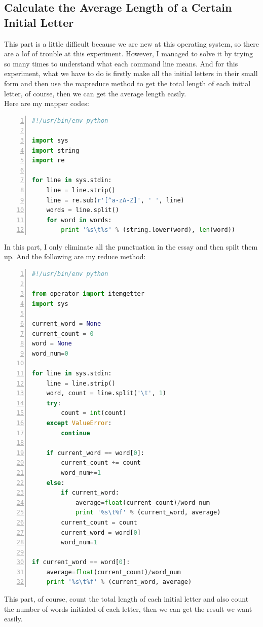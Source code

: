 \documentclass{article}
\begin{document}
\subsection{Calculate the Average Length of a Certain Initial Letter}
This part is a little difficult because we are new at this operating system, so there are a lof of trouble at this experiment. However, I managed to solve it by trying so many times to understand what each command line means. And for this experiment, what we have to do is firstly make all the initial letters in their small form and then use the mapreduce method to get the total length of each initial letter, of course, then we can get the average length easily.\\
Here are my mapper codes:
\begin{lstlisting}[language=python,numbers=left,frame=leftline]
#!/usr/bin/env python

import sys
import string
import re

for line in sys.stdin:
    line = line.strip()
    line = re.sub(r'[^a-zA-Z]', ' ', line)
    words = line.split()
    for word in words:
        print '%s\t%s' % (string.lower(word), len(word))

\end{lstlisting}
In this part, I only eliminate all the punctuation in the essay and then spilt them up. And the following are my reduce method:
\begin{lstlisting}[language=python,numbers=left,frame=leftline]
#!/usr/bin/env python

from operator import itemgetter
import sys

current_word = None
current_count = 0
word = None
word_num=0

for line in sys.stdin:
    line = line.strip()
    word, count = line.split('\t', 1)
    try:
        count = int(count)
    except ValueError:
        continue

    if current_word == word[0]:
        current_count += count
        word_num+=1
    else:
        if current_word:
            average=float(current_count)/word_num
            print '%s\t%f' % (current_word, average)
        current_count = count
        current_word = word[0]
	    word_num=1

if current_word == word[0]:
    average=float(current_count)/word_num
    print '%s\t%f' % (current_word, average)

\end{lstlisting}
This part, of course, count the total length of each initial letter and also count the number of words initialed of each letter, then we can get the result we want easily.\\
\end{document}
